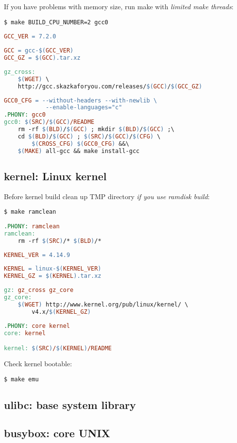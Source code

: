 If you have problems with memory size, run make with \emph{limited make
threads}:
\begin{lstlisting}
$ make BUILD_CPU_NUMBER=2 gcc0
\end{lstlisting}
\begin{lstlisting}[language=make,title=mk/version]
GCC_VER = 7.2.0
\end{lstlisting}
\begin{lstlisting}[language=make,title=mk/package]
GCC = gcc-$(GCC_VER)
GCC_GZ = $(GCC).tar.xz
\end{lstlisting}
\begin{lstlisting}[language=make,title=mk/gz]
gz_cross:
	$(WGET) \
	http://gcc.skazkaforyou.com/releases/$(GCC)/$(GCC_GZ)
\end{lstlisting}
\begin{lstlisting}[language=make,title=mk/cross]
GCC0_CFG = --without-headers --with-newlib \
			--enable-languages="c"
.PHONY: gcc0
gcc0: $(SRC)/$(GCC)/README
	rm -rf $(BLD)/$(GCC) ; mkdir $(BLD)/$(GCC) ;\
	cd $(BLD)/$(GCC) ; $(SRC)/$(GCC)/$(CFG) \
		$(CROSS_CFG) $(GCC0_CFG) &&\
	$(MAKE) all-gcc && make install-gcc
\end{lstlisting}

\subsection{kernel: Linux kernel}

Before kernel build clean up TMP directory \emph{if you use ramdisk build}:
\begin{lstlisting}
$ make ramclean
\end{lstlisting}
\begin{lstlisting}[language=make,title=Makefile]
.PHONY: ramclean
ramclean:
	rm -rf $(SRC)/* $(BLD)/*
\end{lstlisting}

\begin{lstlisting}[language=make,title=mk/version]
KERNEL_VER = 4.14.9
\end{lstlisting}
\begin{lstlisting}[language=make,title=mk/package]
KERNEL = linux-$(KERNEL_VER)
KERNEL_GZ = $(KERNEL).tar.xz
\end{lstlisting}
\begin{lstlisting}[language=make,title=mk/gz]
gz: gz_cross gz_core
gz_core:
	$(WGET) http://www.kernel.org/pub/linux/kernel/ \
		v4.x/$(KERNEL_GZ)
\end{lstlisting}
\begin{lstlisting}[language=make,title=mk/core]
.PHONY: core kernel
core: kernel

kernel: $(SRC)/$(KERNEL)/README
\end{lstlisting}

Check kernel bootable:
\begin{lstlisting}
$ make emu
\end{lstlisting}

\subsection{ulibc: base system library}

\subsection{busybox: core UNIX}

